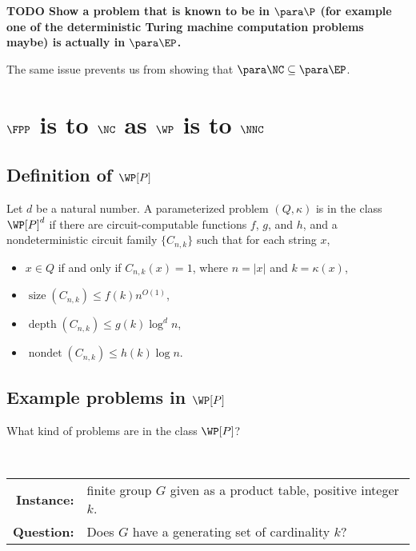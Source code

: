 \documentclass{article}
\newcommand{\todo}[1]{\textbf{TODO #1}}
\DeclareMathOperator{\depth}{depth}
\DeclareMathOperator{\nondet}{nondet}
\DeclareMathOperator{\size}{size}
\begin{document}
\todo{Show a problem that is known to be in $\para \P$ (for example one of the deterministic Turing machine computation problems maybe) is actually in $\para \EP$.}

The same issue prevents us from showing that $\para \NC \subseteq \para \EP$.

\section{\texorpdfstring{$\FPP$}{FPP} is to \texorpdfstring{$\NC$}{NC} as \texorpdfstring{$\WP$}{WP} is to \texorpdfstring{$\NNC$}{NNC}}

\subsection{Definition of \texorpdfstring{$\WP[P]$}{WP[P]}}

\begin{definition}[{$\WP^d[P]$}]
  Let $d$ be a natural number.
  A parameterized problem $(Q, \kappa)$ is in the class $\WP[P]^d$ if there are circuit-computable functions $f$, $g$, and $h$, and a nondeterministic circuit family $\{C_{n, k}\}$ such that for each string $x$,
  \begin{itemize}
  \item $x \in Q$ if and only if $C_{n, k}(x) = 1$, where $n = |x|$ and $k = \kappa(x)$,
  \item $\size(C_{n, k}) \leq f(k) n^{O(1)}$,
  \item $\depth(C_{n, k}) \leq g(k) \log^d n$,
  \item $\nondet(C_{n, k}) \leq h(k) \log n$.
  \end{itemize}
\end{definition}

\subsection{Example problems in \texorpdfstring{$\WP[P]$}{WP[P]}}
\label{sec:rankinwp}

What kind of problems are in the class $\WP[P]$?

\begin{definition}
  \mbox{} \\
  \begin{tabular}{r p{9.2cm}}
    \textbf{Instance:} & finite group $G$ given as a product table, positive integer $k$. \\
    \textbf{Question:} & Does $G$ have a generating set of cardinality $k$?
  \end{tabular}
\end{definition}
\end{document}
